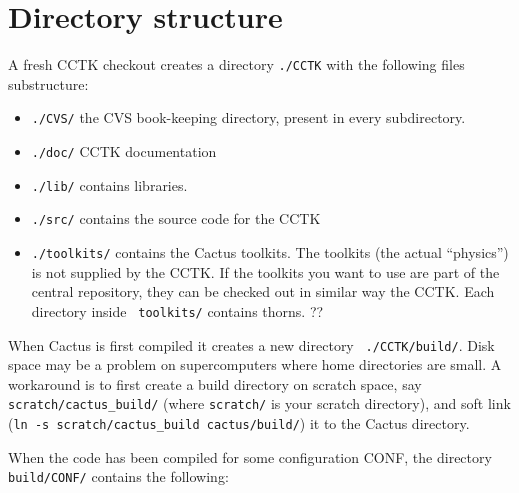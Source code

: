 \section{Directory structure}

A fresh CCTK checkout creates a directory {\tt ./CCTK} with the
following files substructure:
\begin{itemize}

\item{\tt ./CVS/} the CVS book-keeping directory, present in every subdirectory.

\item{\tt ./doc/} CCTK documentation

\item{\tt ./lib/} contains libraries.

\item{\tt ./src/} contains the source code for the CCTK

\item {\tt ./toolkits/} contains the Cactus toolkits. The toolkits
  (the actual ``physics'') is not supplied by the CCTK. If the  toolkits
  you want to use are part of the central repository, they can be
  checked out in similar way the CCTK.  Each directory inside {\tt
    toolkits/} contains thorns. {\q ??}
\end{itemize}

When Cactus is first compiled it creates a new directory {\tt
./CCTK/build/}. Disk space may be a problem on supercomputers where
home directories are small. A workaround is to first create a
build directory on scratch space, say {\tt scratch/cactus\_build/} (where
{\tt scratch/} is your scratch directory), and soft link ({\tt ln -s
scratch/cactus\_build cactus/build/}) it to the Cactus directory.

When the code has been compiled for some configuration CONF, the
directory {\tt build/CONF/} contains the following:

